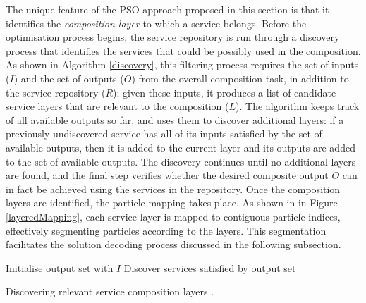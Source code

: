 \documentclass{llncs}
\begin{document}
The unique feature of the PSO approach proposed in this section is that it identifies the \textit{composition layer} to which a service belongs. Before the optimisation process begins, the service repository is run through a discovery process \cite{wang2013genetic} that identifies the services that could be possibly used in the composition. As shown in Algorithm \ref{discovery}, this filtering process requires the set of inputs ($I$) and the set of outputs ($O$) from the overall composition task, in addition to the service repository ($R$); given these inputs, it produces a list of candidate service layers that are relevant to the composition ($L$). The algorithm keeps track of all available outputs so far, and uses them to discover additional layers: if a previously undiscovered service has all of its inputs satisfied by the set of available outputs, then it is added to the current layer and its outputs are added to the set of available outputs. The discovery continues until no additional layers are found, and the final step verifies whether the desired composite output $O$ can in fact be achieved using the services in the repository. Once the composition layers are identified, the particle mapping takes place. As shown in in Figure \ref{layeredMapping}, each service layer is mapped to contiguous particle indices, effectively segmenting particles according to the layers. This segmentation facilitates the solution decoding process discussed in the following subsection.

\begin{algorithm}[!htb]
\setlength{}
 \LinesNumbered
 \SetNlSty{}{}{:}
 Initialise output set with $I$\;
 Discover services satisfied by output set\;
\caption{Discovering relevant service composition layers \cite{wang2013genetic}.}
\label{discovery}
\end{algorithm}
\end{document}
